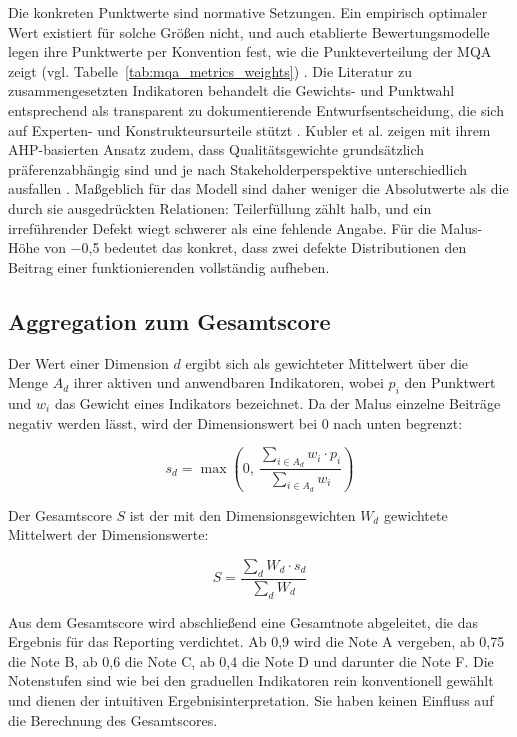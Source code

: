 Die konkreten Punktwerte sind normative Setzungen. Ein empirisch optimaler Wert existiert für solche Größen nicht, und auch etablierte Bewertungsmodelle legen ihre Punktwerte per Konvention fest, wie die Punkteverteilung der MQA zeigt (vgl. Tabelle~\ref{tab:mqa_metrics_weights}) \cite{data_europa}. Die Literatur zu zusammengesetzten Indikatoren behandelt die Gewichts- und Punktwahl entsprechend als transparent zu dokumentierende Entwurfsentscheidung, die sich auf Experten- und Konstrukteursurteile stützt \cite{nardo2008handbook}. Kubler et al. zeigen mit ihrem AHP-basierten Ansatz zudem, dass Qualitätsgewichte grundsätzlich präferenzabhängig sind und je nach Stakeholderperspektive unterschiedlich ausfallen \cite{kubler2018comparison}. Maßgeblich für das Modell sind daher weniger die Absolutwerte als die durch sie ausgedrückten Relationen: Teilerfüllung zählt halb, und ein irreführender Defekt wiegt schwerer als eine fehlende Angabe. Für die Malus-Höhe von $-$0,5 bedeutet das konkret, dass zwei defekte Distributionen den Beitrag einer funktionierenden vollständig aufheben.

\subsection{Aggregation zum Gesamtscore}

Der Wert einer Dimension $d$ ergibt sich als gewichteter Mittelwert über die Menge $A_d$ ihrer aktiven und anwendbaren Indikatoren, wobei $p_i$ den Punktwert und $w_i$ das Gewicht eines Indikators bezeichnet. Da der Malus einzelne Beiträge negativ werden lässt, wird der Dimensionswert bei 0 nach unten begrenzt:

\begin{equation}
s_d = \max\left(0,\ \frac{\sum_{i \in A_d} w_i \cdot p_i}{\sum_{i \in A_d} w_i}\right)
\label{eq:dimension_score}
\end{equation}

Der Gesamtscore $S$ ist der mit den Dimensionsgewichten $W_d$ gewichtete Mittelwert der Dimensionswerte:

\begin{equation}
S = \frac{\sum_{d} W_d \cdot s_d}{\sum_{d} W_d}
\label{eq:overall_score}
\end{equation}

Aus dem Gesamtscore wird abschließend eine Gesamtnote abgeleitet, die das Ergebnis für das Reporting verdichtet. Ab 0,9 wird die Note A vergeben, ab 0,75 die Note B, ab 0,6 die Note C, ab 0,4 die Note D und darunter die Note F. Die Notenstufen sind wie bei den graduellen Indikatoren rein konventionell gewählt und dienen der intuitiven Ergebnisinterpretation. Sie haben keinen Einfluss auf die Berechnung des Gesamtscores.

